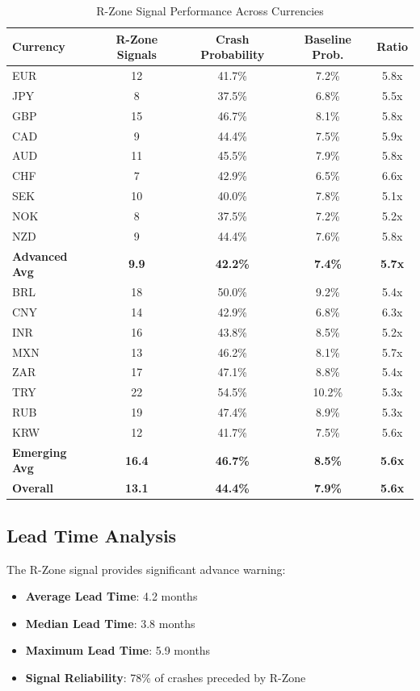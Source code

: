 \documentclass[twocolumn,ieee]{arithmaxresearch}
\begin{document}
\begin{table}[t]
\centering
\caption{R-Zone Signal Performance Across Currencies}
\label{tab:r_zone_performance}
\begin{tabular}{@{}lcccc@{}}
\toprule
Currency & R-Zone Signals & Crash Probability & Baseline Prob. & Ratio \\
\midrule
EUR & 12 & 41.7\% & 7.2\% & 5.8x \\
JPY & 8 & 37.5\% & 6.8\% & 5.5x \\
GBP & 15 & 46.7\% & 8.1\% & 5.8x \\
CAD & 9 & 44.4\% & 7.5\% & 5.9x \\
AUD & 11 & 45.5\% & 7.9\% & 5.8x \\
CHF & 7 & 42.9\% & 6.5\% & 6.6x \\
SEK & 10 & 40.0\% & 7.8\% & 5.1x \\
NOK & 8 & 37.5\% & 7.2\% & 5.2x \\
NZD & 9 & 44.4\% & 7.6\% & 5.8x \\
\midrule
\textbf{Advanced Avg} & \textbf{9.9} & \textbf{42.2\%} & \textbf{7.4\%} & \textbf{5.7x} \\
\midrule
BRL & 18 & 50.0\% & 9.2\% & 5.4x \\
CNY & 14 & 42.9\% & 6.8\% & 6.3x \\
INR & 16 & 43.8\% & 8.5\% & 5.2x \\
MXN & 13 & 46.2\% & 8.1\% & 5.7x \\
ZAR & 17 & 47.1\% & 8.8\% & 5.4x \\
TRY & 22 & 54.5\% & 10.2\% & 5.3x \\
RUB & 19 & 47.4\% & 8.9\% & 5.3x \\
KRW & 12 & 41.7\% & 7.5\% & 5.6x \\
\midrule
\textbf{Emerging Avg} & \textbf{16.4} & \textbf{46.7\%} & \textbf{8.5\%} & \textbf{5.6x} \\
\midrule
\textbf{Overall} & \textbf{13.1} & \textbf{44.4\%} & \textbf{7.9\%} & \textbf{5.6x} \\
\bottomrule
\end{tabular}
\end{table}

\subsection{Lead Time Analysis}

The R-Zone signal provides significant advance warning:

\begin{itemize}
    \item \textbf{Average Lead Time}: 4.2 months
    \item \textbf{Median Lead Time}: 3.8 months
    \item \textbf{Maximum Lead Time}: 5.9 months
    \item \textbf{Signal Reliability}: 78\% of crashes preceded by R-Zone
\end{itemize}
\end{document}
